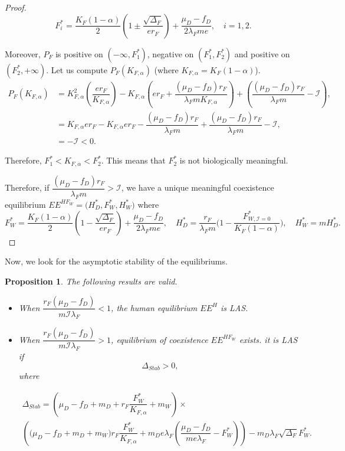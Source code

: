 \documentclass{article}
\newcommand{\lfw}{\lambda_{F}}
\newcommand{\lfw}{\lambda_{F}}
\newcommand{\cI}{\mathcal{I}}
\newtheorem{prop}{Proposition}
\begin{document}
\begin{proof}
\begin{equation*}
F_i^* = \dfrac{K_F(1-\alpha)}{2}\left(1 \pm \dfrac{\sqrt{\Delta_F}}{er_F}\right) + \dfrac{\mu_D - f_D}{2\lfw m e}, \quad i=1,2.
\end{equation*}

Moreover, $P_F$ is positive on $(-\infty, F_1^*)$, negative on $(F^*_1, F^*_2)$ and positive on $(F^*_2, +\infty)$. Let us compute $P_F(K_{F,\alpha})$ (where $ K_{F,\alpha} = K_F(1-\alpha)$).
\begin{align*}
P_F(K_{F,\alpha}) &= K_{F,\alpha}^2 \left(\dfrac{er_F}{K_{F,\alpha}} \right) - K_{F,\alpha} \left(er_F + \dfrac{(\mu_D - f_D) r_F}{\lfw m K_{F,\alpha}} \right) + \left(\dfrac{(\mu_D - f_D) r_F}{\lfw m} - \cI \right), \\
&= K_{F,\alpha}er_F - K_{F,\alpha}er_F - \dfrac{(\mu_D - f_D) r_F}{\lfw m} + \dfrac{(\mu_D - f_D) r_F}{\lfw m} - \cI, \\
&= -\cI< 0.
\end{align*}

Therefore, $F_1^* < K_{F, \alpha} < F_2^*$. This means that $F_2^*$ is not biologically meaningful.

Therefore, if $\dfrac{(\mu_D - f_D) r_F}{\lfw m} > \cI$, we have a unique meaningful coexistence equilibrium $EE^{HF_W} = \Big(H^*_{D}, F^*_{W}, H^*_{W} \Big)$  
where $$F^*_{W} = \dfrac{K_F(1-\alpha)}{2}\left(1 - \dfrac{\sqrt{\Delta_F}}{er_F}\right) + \dfrac{\mu_D - f_D}{2\lfw m e},\quad
H^*_{D} = \dfrac{r_F}{\lfw m} \Big(1 - \dfrac{F^*_{W, \cI = 0}}{K_F(1-\alpha)} \Big),
\quad 
H^*_{W} = m H^*_{D}.$$
\end{proof}

Now, we look for the asymptotic stability of the equilibriums.

\begin{prop}\label{propLAS} The following results are valid.
\begin{itemize}
\item When $\dfrac{r_F(\mu_D - f_D)}{m  \cI \lfw} < 1$, the human equilibrium $EE^{H}$ is LAS.
\item When $\dfrac{r_F(\mu_D - f_D)}{m  \cI \lfw} > 1$, equilibrium of coexistence $EE^{HF_W}$  exists. it is LAS if 
$$\Delta_{Stab} > 0,$$  where 

\begin{multline*}
\Delta_{Stab} = \left(\mu_D -f_D + m_D + r_F \dfrac{F_W^*}{K_{F, \alpha}} + m_W\right) \times \\
\left(\big( \mu_D -f_D + m_D + m_W) r_F \dfrac{F^*_W}{K_{F, \alpha}}   + m_D e\lfw   \left(\dfrac{\mu_D - f_D}{m e\lfw} - F^*_W \right)\right) - m_D \lfw \sqrt{\Delta_F}  F^*_{W}.
\end{multline*}
\end{itemize}
\end{prop}
\end{document}
